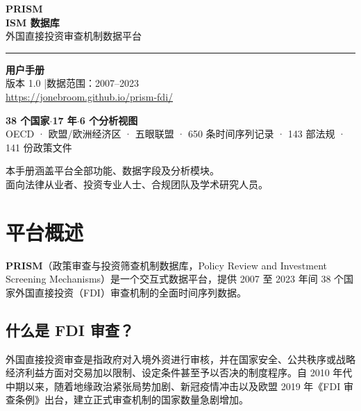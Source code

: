 \documentclass[12pt,a4paper]{article}
\begin{document}
\begin{titlepage}
  \centering
  \vspace*{3cm}

  {\Huge\bfseries\color{prismclay} PRISM}\\[0.4em]
  {\LARGE\bfseries\color{darkink} ISM 数据库}\\[0.6em]
  {\large\color{gray} 外国直接投资审查机制数据平台}

  \vspace{1.5cm}
  \color{midgray}\rule{0.5\linewidth}{1pt}\color{black}
  \vspace{1.5cm}

  {\Large\bfseries 用户手册}\\[0.8em]
  {\normalsize 版本 1.0 \quad|\quad 数据范围：2007--2023}\\[0.4em]
  {\normalsize \url{https://jonebroom.github.io/prism-fdi/}}

  \vspace{2cm}
  \begin{keybox}
    \centering
    \textbf{38 个国家}\quad $\cdot$\quad \textbf{17 年}\quad $\cdot$\quad \textbf{6 个分析视图}\\
    \small OECD · 欧盟/欧洲经济区 · 五眼联盟 · 650 条时间序列记录 · 143 部法规 · 141 份政策文件
  \end{keybox}

  \vfill
  {\small\color{gray} 本手册涵盖平台全部功能、数据字段及分析模块。\\
  面向法律从业者、投资专业人士、合规团队及学术研究人员。}
\end{titlepage}

\tableofcontents
\newpage

\section{平台概述}
\label{sec:overview}

\textbf{PRISM}（政策审查与投资筛查机制数据库，Policy Review and Investment Screening Mechanisms）是一个交互式数据平台，提供 2007 至 2023 年间 38 个国家外国直接投资（FDI）审查机制的全面时间序列数据。

\subsection{什么是 FDI 审查？}

外国直接投资审查是指政府对入境外资进行审核，并在国家安全、公共秩序或战略经济利益方面对交易加以限制、设定条件甚至予以否决的制度程序。自 2010 年代中期以来，随着地缘政治紧张局势加剧、新冠疫情冲击以及欧盟 2019 年《FDI 审查条例》出台，建立正式审查机制的国家数量急剧增加。
\end{document}
